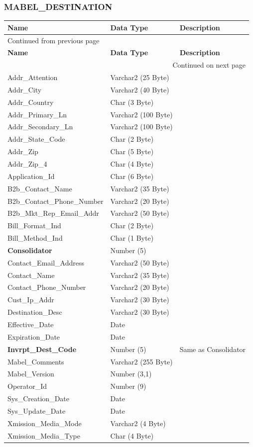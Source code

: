 \documentclass[12pt,twoside]{article}
\begin{document}
\subsubsection{MABEL\_DESTINATION}
\label{sec:orgheadline156}
\footnotesize

\begin{longtable}{l|l|l}
\hline
\textbf{Name} & \textbf{Data Type} & \textbf{Description}\\
\hline
\endfirsthead
\multicolumn{3}{l}{Continued from previous page} \\
\hline

\textbf{Name} & \textbf{Data Type} & \textbf{Description} \\

\hline
\endhead
\hline\multicolumn{3}{r}{Continued on next page} \\
\endfoot
\endlastfoot
\hline
Addr\_Attention & Varchar2 (25 Byte) & \\
Addr\_City & Varchar2 (40 Byte) & \\
Addr\_Country & Char (3 Byte) & \\
Addr\_Primary\_Ln & Varchar2 (100 Byte) & \\
Addr\_Secondary\_Ln & Varchar2 (100 Byte) & \\
Addr\_State\_Code & Char (2 Byte) & \\
Addr\_Zip & Char (5 Byte) & \\
Addr\_Zip\_4 & Char (4 Byte) & \\
Application\_Id & Char (6 Byte) & \\
B2b\_Contact\_Name & Varchar2 (35 Byte) & \\
B2b\_Contact\_Phone\_Number & Varchar2 (20 Byte) & \\
B2b\_Mkt\_Rep\_Email\_Addr & Varchar2 (50 Byte) & \\
Bill\_Format\_Ind & Char (2 Byte) & \\
Bill\_Method\_Ind & Char (1 Byte) & \\
\textbf{Consolidator} & Number (5) & \\
Contact\_Email\_Address & Varchar2 (50 Byte) & \\
Contact\_Name & Varchar2 (35 Byte) & \\
Contact\_Phone\_Number & Varchar2 (20 Byte) & \\
Cust\_Ip\_Addr & Varchar2 (30 Byte) & \\
Destination\_Desc & Varchar2 (30 Byte) & \\
Effective\_Date & Date & \\
Expiration\_Date & Date & \\
\textbf{Invrpt\_Dest\_Code} & Number (5) & Same as Consolidator\\
Mabel\_Comments & Varchar2 (255 Byte) & \\
Mabel\_Version & Number (3,1) & \\
Operator\_Id & Number (9) & \\
Sys\_Creation\_Date & Date & \\
Sys\_Update\_Date & Date & \\
Xmission\_Media\_Mode & Varchar2 (4 Byte) & \\
Xmission\_Media\_Type & Char (4 Byte) & \\
\hline
\end{longtable}
\end{document}
